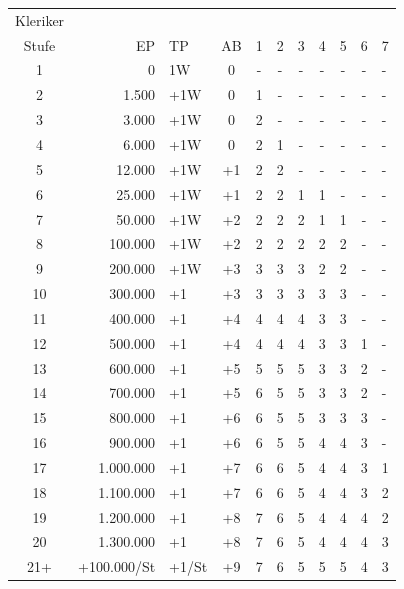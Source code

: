 \documentclass[11pt]{wbzine}
\begin{document}
\begin{tabularx}{\textwidth}{crlcccccccZ}
Kleriker & & & & & & & & & & \\
  Stufe &          EP & TP    & AB & 1 & 2 & 3 & 4 & 5 & 6 & 7 \\
  1     &           0 & 1W    & 0  & - & - & - & - & - & - & - \\
  2     &       1.500 & +1W   & 0  & 1 & - & - & - & - & - & - \\
  3     &       3.000 & +1W   & 0  & 2 & - & - & - & - & - & - \\
  4     &       6.000 & +1W   & 0  & 2 & 1 & - & - & - & - & - \\
  5     &      12.000 & +1W   & +1 & 2 & 2 & - & - & - & - & - \\
  6     &      25.000 & +1W   & +1 & 2 & 2 & 1 & 1 & - & - & - \\
  7     &      50.000 & +1W   & +2 & 2 & 2 & 2 & 1 & 1 & - & - \\
  8     &     100.000 & +1W   & +2 & 2 & 2 & 2 & 2 & 2 & - & - \\
  9     &     200.000 & +1W   & +3 & 3 & 3 & 3 & 2 & 2 & - & - \\
  10    &     300.000 & +1    & +3 & 3 & 3 & 3 & 3 & 3 & - & - \\
  11    &     400.000 & +1    & +4 & 4 & 4 & 4 & 3 & 3 & - & - \\
  12    &     500.000 & +1    & +4 & 4 & 4 & 4 & 3 & 3 & 1 & - \\
  13    &     600.000 & +1    & +5 & 5 & 5 & 5 & 3 & 3 & 2 & - \\
  14    &     700.000 & +1    & +5 & 6 & 5 & 5 & 3 & 3 & 2 & - \\
  15    &     800.000 & +1    & +6 & 6 & 5 & 5 & 3 & 3 & 3 & - \\
  16    &     900.000 & +1    & +6 & 6 & 5 & 5 & 4 & 4 & 3 & - \\
  17    &   1.000.000 & +1    & +7 & 6 & 6 & 5 & 4 & 4 & 3 & 1 \\
  18    &   1.100.000 & +1    & +7 & 6 & 6 & 5 & 4 & 4 & 3 & 2 \\
  19    &   1.200.000 & +1    & +8 & 7 & 6 & 5 & 4 & 4 & 4 & 2 \\
  20    &   1.300.000 & +1    & +8 & 7 & 6 & 5 & 4 & 4 & 4 & 3 \\
  21+   & +100.000/St & +1/St & +9 & 7 & 6 & 5 & 5 & 5 & 4 & 3 \\
\end{tabularx}
\end{document}
